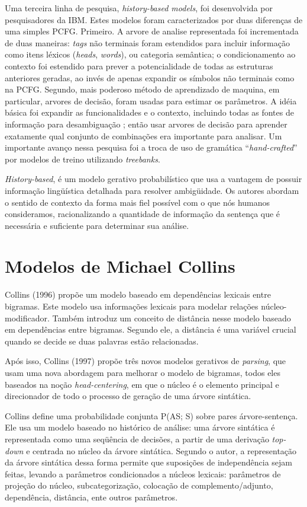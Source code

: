 Uma terceira linha de pesquisa, \emph{history-based models}, foi desenvolvida por pesquisadores da IBM. Estes modelos foram caracterizados por duas diferenças de uma simples PCFG. Primeiro. A arvore de analise representada foi incrementada de duas maneiras: \emph{tags} não terminais foram estendidos para incluir informação como itens léxicos (\emph{heads}, \emph{words}), ou categoria semântica; o condicionamento ao contexto foi estendido para prever a potencialidade de todas as estruturas anteriores geradas, ao invés de apenas expandir os símbolos não terminais como na PCFG.
Segundo, mais poderoso método de aprendizado de maquina, em particular, arvores de decisão, foram usadas para estimar os parâmetros. A idéia básica foi expandir as funcionalidades e o contexto, incluindo todas as fontes de informação para desambiguação ; então usar arvores de decisão para aprender exatamente qual conjunto de combinações era importante para analisar.
Um importante avanço nessa pesquisa foi a troca de uso de gramática ``\emph{hand-crafted}''  por modelos de treino utilizando \emph{treebanks}.

\emph{History-based}, é um modelo gerativo probabilístico que usa a vantagem de possuir informação lingüística detalhada para resolver ambigüidade. Os autores abordam o sentido de contexto da forma mais fiel possível com o que nós humanos consideramos, racionalizando a quantidade de informação da sentença
que é necessária e suficiente para determinar sua análise.


\section{Modelos de Michael Collins}
\label{sec:modelos_collins}

Collins (1996) propõe um modelo baseado em dependências lexicais entre bigramas. Este modelo usa informações lexicais para modelar relações núcleo-modificador. Também introduz um conceito de distância nesse modelo baseado em dependências entre bigramas. Segundo ele, a distância é uma variável crucial quando se decide se duas palavras estão relacionadas.

Após isso, Collins (1997) propõe três novos modelos gerativos de \emph{parsing}, que usam uma nova abordagem para melhorar o modelo de bigramas, todos eles baseados na noção \emph{head-centering}, em que o núcleo é o elemento principal e direcionador de todo o processo de geração de uma árvore sintática.

Collins define uma probabilidade conjunta P(AS; S) sobre pares árvore-sentença. Ele usa um modelo baseado no histórico de análise: uma árvore sintática é representada como uma seqüência de decisões, a partir de uma derivação \emph{top-down} e centrada no núcleo da árvore sintática. Segundo o autor, a representação da árvore sintática dessa forma permite que suposições de independência sejam feitas, levando a parâmetros condicionados a núcleos lexicais: parâmetros de projeção do núcleo, subcategorização, colocação de complemento/adjunto, dependência, distância, ente outros parâmetros.

